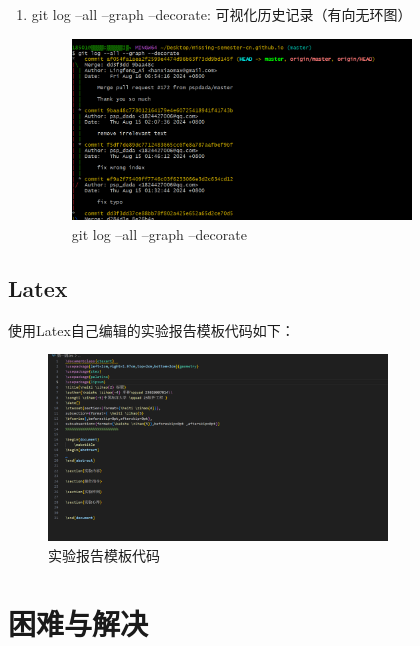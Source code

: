 \documentclass{ctexart}
\begin{document}
\begin{enumerate}
    \vspace{-5pt}\item git log --all --graph --decorate: 可视化历史记录（有向无环图）
    \begin{figure}[H]
       \centering
       \includegraphics[width=9cm]{6.png}
       \caption{git log --all --graph --decorate}
       \label{fig:15}
   \end{figure}
\end{enumerate}


\subsection{Latex}
使用Latex自己编辑的实验报告模板代码如下：
\begin{figure}[H]
    \centering
    \includegraphics[width=9cm]{20240830000426.png}
    \caption{实验报告模板代码}
    \label{fig:16}
\end{figure}
\section{困难与解决}
\end{document}
